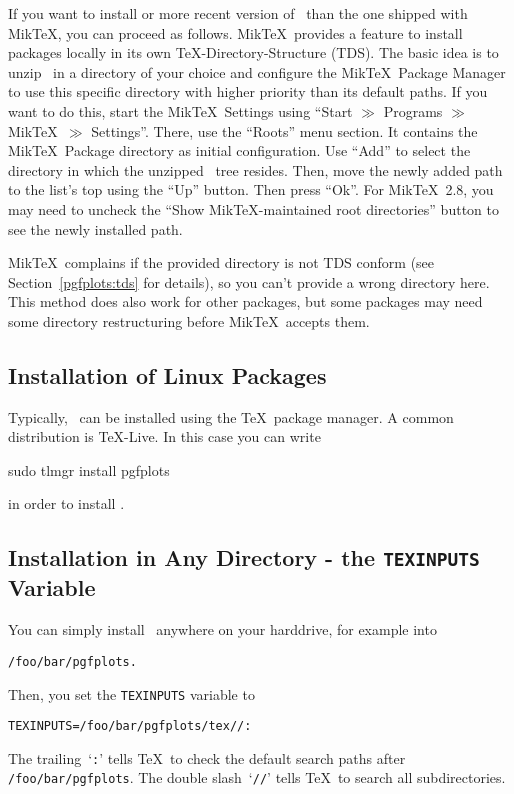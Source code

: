 If you want to install or more recent version of \PGFPlots\ than the one shipped with Mik\TeX, you can proceed as follows. Mik\TeX\ provides a feature to install packages locally in its own \TeX-Directory-Structure (TDS). The basic idea is to unzip \PGFPlots\ in a directory of your choice and configure the Mik\TeX\ Package Manager to use this specific directory with higher priority than its default paths. If you want to do this, start the Mik\TeX\ Settings using ``Start $\gg$ Programs $\gg$ Mik\TeX\ $\gg$ Settings''. There, use the ``Roots'' menu section. It contains the Mik\TeX\ Package directory as initial configuration. Use ``Add'' to select the directory in which the unzipped \PGFPlots\ tree resides. Then, move the newly added path to the list's top using the ``Up'' button. Then press ``Ok''. For Mik\TeX\ 2.8, you may need to uncheck the ``Show Mik\TeX-maintained root directories'' button to see the newly installed path.

Mik\TeX\ complains if the provided directory is not TDS conform (see Section~\ref{pgfplots:tds} for details), so you can't provide a wrong directory here. This method does also work for other packages, but some packages may need some directory restructuring before Mik\TeX\ accepts them.

\subsection{Installation of Linux Packages}
Typically, \PGFPlots\ can be installed using the \TeX\ package manager. A common distribution is \TeX-Live. In this case you can write
\begin{codeexample}
sudo tlmgr install pgfplots
\end{codeexample}
\noindent in order to install \PGFPlots.


\subsection{Installation in Any Directory - the \texttt{TEXINPUTS} Variable}
You can simply install \PGFPlots\ anywhere on your harddrive, for example into
\begin{verbatim}
/foo/bar/pgfplots.
\end{verbatim}
Then, you set the \texttt{TEXINPUTS} variable to
\begin{verbatim}
TEXINPUTS=/foo/bar/pgfplots/tex//:
\end{verbatim}
The trailing~`\texttt{:}' tells \TeX\ to check the default search paths after \lstinline!/foo/bar/pgfplots!. The double slash~`\texttt{//}' tells \TeX\ to search all subdirectories.

